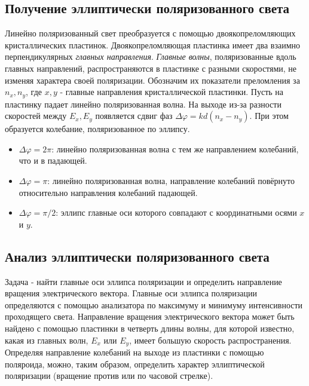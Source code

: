 \subsection*{Получение эллиптически поляризованного света}
Линейно поляризованный свет преобразуется с помощью двоякопреломляющих кристаллических пластинок.
\n\n
Двоякопреломляющая пластинка
имеет два взаимно перпендикулярных
\textit{главных направления}. \textit{Главные волны}, поляризованные
вдоль главных направлений, распространяются в пластинке с разными
скоростями, не изменяя характера своей поляризации. Обозначим их показатели преломления за $n_x, n_y$, где $x, y$ - главные направления кристаллической пластинки.
\n\n
Пусть на пластинку падает линейно поляризованная волна. На выходе из-за разности скоростей между $E_x, E_y$ появляется сдвиг фаз $\Delta \varphi = kd(n_x - n_y)$. При этом образуется колебание, поляризованное по эллипсу.
\begin{itemize}
\item $\Delta \varphi = 2 \pi$: линейно поляризованная волна с тем же
направлением колебаний, что и в падающей.
\item $\Delta \varphi = \pi$: линейно поляризованная волна, направление колебаний повёрнуто относительно направления колебаний падающей.
\item $\Delta \varphi = \pi / 2$: эллипс главные
оси которого совпадают с координатными осями $x$ и $y$.
\end{itemize}

\subsection*{Анализ эллиптически поляризованного света}
Задача - найти главные оси эллипса поляризации и определить направление вращения электрического вектора. Главные оси эллипса поляризации определяются с помощью анализатора по максимуму и минимуму интенсивности проходящего света. Направление вращения электрического вектора может быть найдено
с помощью пластинки в четверть длины волны, для которой известно,
какая из главных волн, $E_x$ или $E_y$, имеет большую скорость распространения. Определяя направление колебаний
на выходе из пластинки с помощью поляроида, можно, таким образом, определить характер эллиптической поляризации (вращение против или по часовой стрелке).

